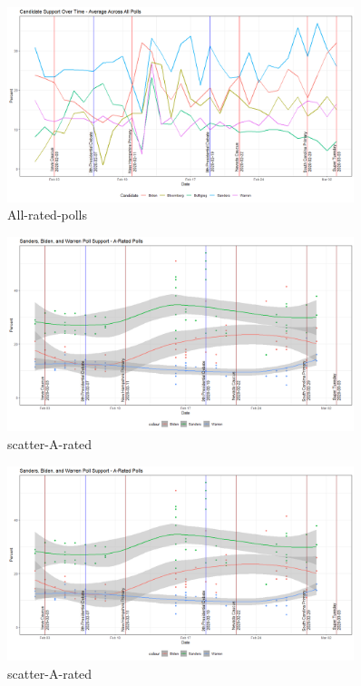 \begin{figure}[H]
    \centering
    \includegraphics[width=0.9\textwidth]{figures/All-rated-polls.png}
    \caption{All-rated-polls}
    \label{All-rated-polls}
\end{figure}
\begin{figure}[H]
    \centering
    \includegraphics[width=0.9\textwidth]{figures/scatter-A-rated.png}
    \caption{scatter-A-rated}
    \label{scatter-A-rated}
\end{figure}
\begin{figure}[H]
    \centering
    \includegraphics[width=0.9\textwidth]{figures/scatter-A-rated.png}
    \caption{scatter-A-rated}
    \label{scatter-A-rated}
\end{figure}
